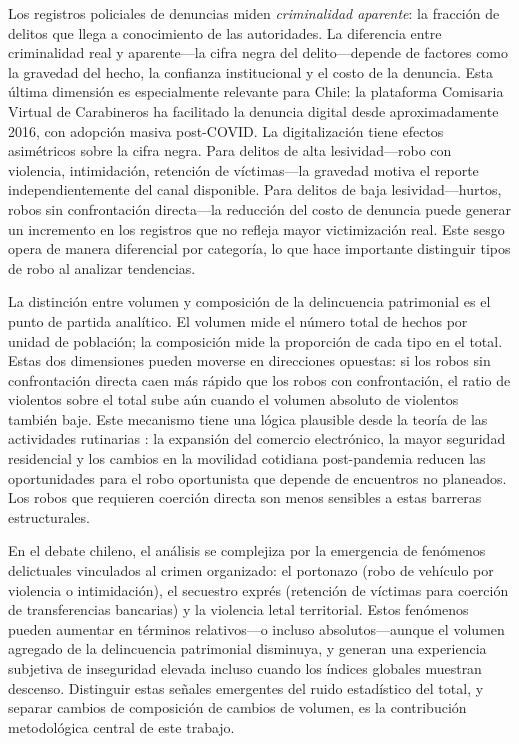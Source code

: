 \documentclass[12pt,a4paper]{article}
\begin{document}
Los registros policiales de denuncias miden \emph{criminalidad aparente}: la fracci\'on de
delitos que llega a conocimiento de las autoridades. La diferencia entre criminalidad
real y aparente---la cifra negra del delito---depende de factores como la gravedad del hecho, la
confianza institucional y el costo de la denuncia. Esta \'ultima dimensi\'on es
especialmente relevante para Chile: la plataforma Comisaria Virtual de Carabineros ha
facilitado la denuncia digital desde aproximadamente 2016, con adopci\'on masiva
post-COVID. La digitalizaci\'on tiene efectos asim\'etricos sobre la cifra negra. Para
delitos de alta lesividad---robo con violencia, intimidaci\'on, retenci\'on de
v\'ictimas---la gravedad motiva el reporte independientemente del canal disponible.
Para delitos de baja lesividad---hurtos, robos sin confrontaci\'on directa---la
reducci\'on del costo de denuncia puede generar un incremento en los registros que no
refleja mayor victimizaci\'on real. Este sesgo opera de manera diferencial por
categor\'ia, lo que hace importante distinguir tipos de robo al analizar tendencias.

La distinci\'on entre volumen y composici\'on de la delincuencia patrimonial es el
punto de partida anal\'itico. El volumen mide el n\'umero total de hechos por unidad
de poblaci\'on; la composici\'on mide la proporci\'on de cada tipo en el total. Estas
dos dimensiones pueden moverse en direcciones opuestas: si los robos sin confrontaci\'on
directa caen m\'as r\'apido que los robos con confrontaci\'on, el ratio de violentos
sobre el total sube a\'un cuando el volumen absoluto de violentos tambi\'en baje. Este
mecanismo tiene una l\'ogica plausible desde la teor\'ia de las actividades rutinarias
\citep{cohen1979}: la expansi\'on del comercio electr\'onico, la mayor seguridad
residencial y los cambios en la movilidad cotidiana post-pandemia reducen las
oportunidades para el robo oportunista que depende de encuentros no planeados. Los
robos que requieren coerci\'on directa son menos sensibles a estas barreras
estructurales.

En el debate chileno, el an\'alisis se complejiza por la emergencia de fen\'omenos
delictuales vinculados al crimen organizado: el portonazo (robo de veh\'iculo por
violencia o intimidaci\'on), el secuestro expr\'es (retenci\'on de v\'ictimas para
coerci\'on de transferencias bancarias) y la violencia letal territorial. Estos
fen\'omenos pueden aumentar en t\'erminos relativos---o incluso absolutos---aunque el
volumen agregado de la delincuencia patrimonial disminuya, y generan una experiencia
subjetiva de inseguridad elevada incluso cuando los \'indices globales muestran
descenso. Distinguir estas se\~nales emergentes del ruido estad\'istico del total, y
separar cambios de composici\'on de cambios de volumen, es la contribuci\'on
metodol\'ogica central de este trabajo.
\end{document}
